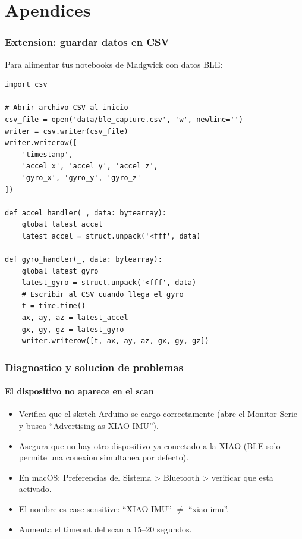 \documentclass[11pt,a4paper]{article}
\begin{document}
\part{Apendices}


\section{Extension: guardar datos en CSV}

Para alimentar tus notebooks de Madgwick con datos BLE:

\begin{lstlisting}[style=python]
import csv

# Abrir archivo CSV al inicio
csv_file = open('data/ble_capture.csv', 'w', newline='')
writer = csv.writer(csv_file)
writer.writerow([
    'timestamp',
    'accel_x', 'accel_y', 'accel_z',
    'gyro_x', 'gyro_y', 'gyro_z'
])

def accel_handler(_, data: bytearray):
    global latest_accel
    latest_accel = struct.unpack('<fff', data)

def gyro_handler(_, data: bytearray):
    global latest_gyro
    latest_gyro = struct.unpack('<fff', data)
    # Escribir al CSV cuando llega el gyro
    t = time.time()
    ax, ay, az = latest_accel
    gx, gy, gz = latest_gyro
    writer.writerow([t, ax, ay, az, gx, gy, gz])
\end{lstlisting}


\section{Diagnostico y solucion de problemas}

\subsection{El dispositivo no aparece en el scan}

\begin{itemize}
    \item Verifica que el sketch Arduino se cargo correctamente
          (abre el Monitor Serie y busca ``Advertising as XIAO-IMU'').
    \item Asegura que no hay otro dispositivo ya conectado a la
          XIAO (BLE solo permite una conexion simultanea por defecto).
    \item En macOS: Preferencias del Sistema > Bluetooth > verificar
          que esta activado.
    \item El nombre es case-sensitive: ``XIAO-IMU'' $\neq$
          ``xiao-imu''.
    \item Aumenta el timeout del scan a 15--20 segundos.
\end{itemize}
\end{document}
